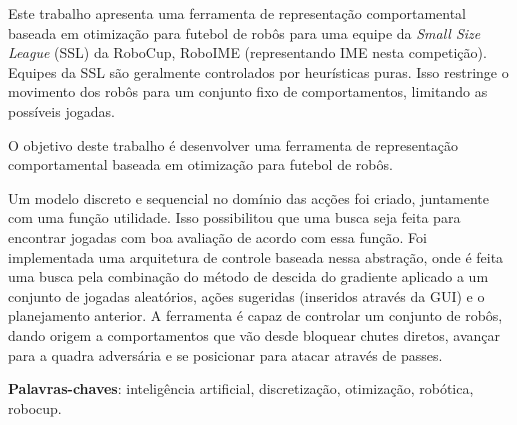 \setlength{\absparsep}{18pt} %
\begin{resumo}

  Este trabalho apresenta uma ferramenta de representação comportamental baseada
  em otimização para futebol de robôs para uma equipe da \textit{Small Size
  League} (SSL) da RoboCup, RoboIME (representando IME nesta competição).
  Equipes da SSL são geralmente controlados por heurísticas puras. Isso
  restringe o movimento dos robôs para um conjunto fixo de comportamentos,
  limitando as possíveis jogadas.

  O objetivo deste trabalho é desenvolver uma ferramenta de representação
  comportamental baseada em otimização para futebol de robôs.

  Um modelo discreto e sequencial no domínio das acções foi criado, juntamente
  com uma função utilidade. Isso possibilitou que uma busca seja feita para
  encontrar jogadas com boa avaliação de acordo com essa função. Foi
  implementada uma arquitetura de controle baseada nessa abstração, onde é feita
  uma busca pela combinação do método de descida do gradiente aplicado a um
  conjunto de jogadas aleatórios, ações sugeridas (inseridos através da GUI) e o
  planejamento anterior. A ferramenta é capaz de controlar um conjunto de robôs,
  dando origem a comportamentos que vão desde bloquear chutes diretos, avançar
  para a quadra adversária e se posicionar para atacar através de passes.

  \textbf{Palavras-chaves}: inteligência artificial, discretização, otimização, robótica, robocup.
\end{resumo}


